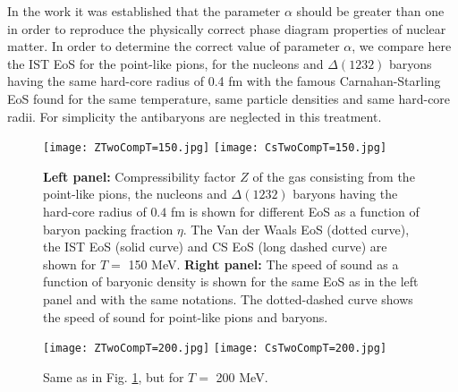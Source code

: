 \documentclass[12pt]{article}
\begin{document}
In the work  \cite{Bugaev:13NPA} it was established that the parameter  $\alpha$ should be  greater than one in order 
to reproduce the physically correct phase diagram properties of nuclear matter.  In order to determine the correct value of parameter   
$\alpha$, we compare here the IST EoS for the  point-like 
pions, for the nucleons and $\Delta (1232)$  baryons having the same hard-core radius of 0.4 fm with the famous Carnahan-Starling EoS  \cite{CSeos} found for the same temperature, same particle densities  and same   hard-core radii.   For simplicity  the antibaryons are neglected in this treatment. 



\begin{figure}[htbp]
\centerline{\hspace*{-4.4mm}
\texttt{[image: ZTwoCompT=150.jpg]}
  \hspace*{-11mm}
\texttt{[image: CsTwoCompT=150.jpg]}
 } 
 \caption{{\bf Left panel:} Compressibility factor $Z$  of  the gas consisting from the point-like pions,  the nucleons and $\Delta (1232)$  baryons  having the hard-core radius of $0.4$ fm  is shown for different EoS  as a function of baryon packing fraction $\eta$.  The  Van der Waals  EoS (dotted curve), the IST EoS (solid curve)  and CS EoS (long dashed curve) are shown 
  for $T=$ 150 MeV. {\bf Right panel:} The speed of sound as a function of baryonic density is shown for the same EoS as in the left panel  and with the same notations. The dotted-dashed curve shows the   speed of sound for  point-like pions and baryons.}
  \label{Fig1}
\end{figure}


\begin{figure}[htbp]
\centerline{\hspace*{-4.4mm}
\texttt{[image: ZTwoCompT=200.jpg]}
  \hspace*{-11mm}
\texttt{[image: CsTwoCompT=200.jpg]}
 } 
 \caption{Same as in Fig. \ref{Fig1}, but for  $T=$ 200 MeV. }
  \label{Fig2}
\end{figure}
\end{document}
